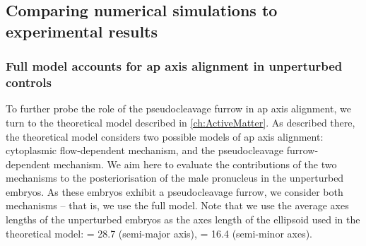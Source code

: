 
\subsection{Comparing numerical simulations to experimental results}\label{subsec:expVsTheoryPcFurrow}
\subsubsection{Full model accounts for \acs{ap} axis alignment in unperturbed controls}\label{subsubsec:fullModelForWT}
To further probe the role of the pseudocleavage furrow in \ac{ap} axis alignment, we turn to the theoretical model described in \autoref{ch:ActiveMatter}. As described there, the theoretical model considers two possible models of \ac{ap} axis alignment: cytoplasmic flow-dependent mechanism, and the pseudocleavage furrow-dependent mechanism. We aim here to evaluate the contributions of the two mechanisms to the posteriorisation of the male pronucleus in the unperturbed embryos. As these embryos exhibit a pseudocleavage furrow, we consider both mechanisms -- that is, we use the full model. Note that we use the average axes lengths of the unperturbed embryos as the axes length of the ellipsoid used in the theoretical model: \longAxisLength = \SI{28.7}{\unitLength} (semi-major axis), \shortAxisLength = \SI{16.4}{\unitLength} (semi-minor axes).

